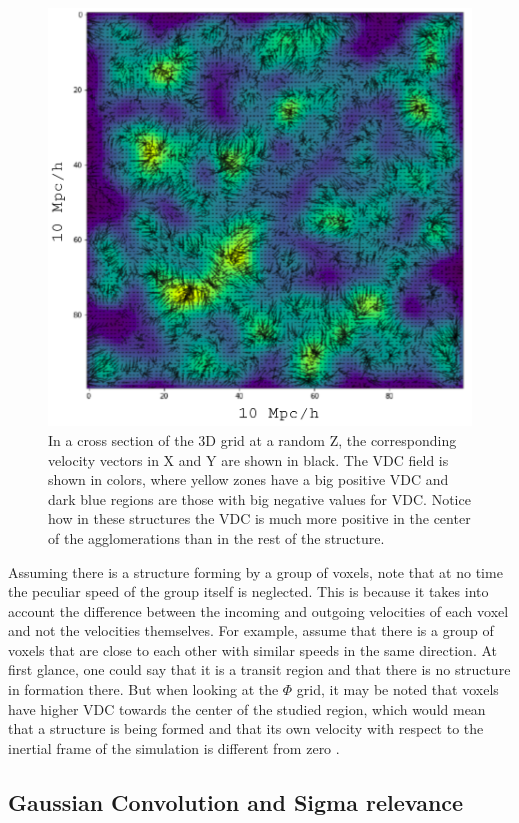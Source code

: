 \begin{figure}
    \centering
    \includegraphics[width=320pt]{gauss.png}
    \caption{In a cross section of the 3D grid at a random Z, the corresponding  velocity vectors in X and Y are shown in black. The VDC field is shown in colors, where yellow zones have a big positive VDC and dark blue regions are those with big negative values for VDC. Notice how in these structures the VDC is much more positive in the center of the agglomerations than in the rest of the structure.}
    \label{fig:2D_VDC}
\end{figure}

Assuming there is a structure forming by a group of voxels, note that at no time the peculiar speed of the group itself is neglected. This is because it takes into account the difference between the incoming and outgoing velocities of each voxel and not the velocities themselves. For example, assume that there is a group of voxels that are close to each other with similar speeds in the same direction. At first glance, one could say that it is a transit region and that there is no structure in formation there. But when looking at the $\Phi$ grid, it may be noted that voxels have higher VDC towards the center of the studied region, which would mean that a structure is being formed and that its own velocity with respect to the inertial frame of the simulation is different from zero .


\subsection{Gaussian Convolution and Sigma relevance}

